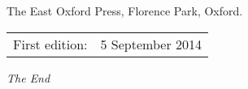 \documentclass[17pt, a4paper,extrafontsizes]{memoir}
\begin{document}
The East Oxford Press, Florence Park, Oxford.

\begin{center}
\begin{tabular}{ll}
First edition:                        & 5 September 2014 \\
\end{tabular}
\end{center}
\clearpage
\mainmatter
\thispagestyle{chapter}
\pagestyle{simple}


\begin{center}
\textit{The End}
\end{center}
\end{document}
